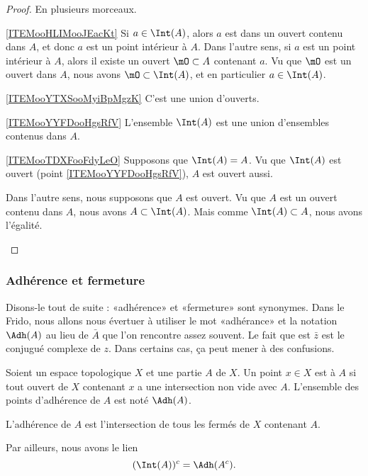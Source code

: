 \begin{proof}
    En plusieurs morceaux.
    \begin{subproof}
    \item[\ref{ITEMooHLIMooJEacKt}]
        Si \( a\in\Int(A)\), alors \( a\) est dans un ouvert contenu dans \( A\), et donc \( a\) est un point intérieur à \( A\). Dans l'autre sens, si \( a\) est un point intérieur à \( A\), alors il existe un ouvert \( \mO\subset A\) contenant \( a\). Vu que \( \mO\) est un ouvert dans \( A\), nous avons \( \mO\subset\Int(A)\), et en particulier \( a\in \Int(A)\).
    \item[\ref{ITEMooYTXSooMyiBpMgzK}]
            C'est une union d'ouverts.
    \item[\ref{ITEMooYYFDooHgsRfV}]
        L'ensemble \( \Int(A)\) est une union d'ensembles contenus dans \( A\).
    \item[\ref{ITEMooTDXFooFdyLeO}]
        Supposons que \( \Int(A)=A\). Vu que \( \Int(A)\) est ouvert (point \ref{ITEMooYYFDooHgsRfV}), \( A\) est ouvert aussi.

        Dans l'autre sens, nous supposons que \( A\) est ouvert. Vu que \( A\) est un ouvert contenu dans \( A\), nous avons \( A\subset\Int(A)\). Mais comme \( \Int(A)\subset A\), nous avons l'égalité.
    \end{subproof}
\end{proof}

\subsubsection{Adhérence et fermeture}

Disons-le tout de suite : «adhérence» et «fermeture» sont synonymes. Dans le Frido, nous allons nous évertuer à utiliser le mot «adhérance» et la notation \( \Adh(A)\) au lieu de \( \bar A\) que l'on rencontre assez souvent. Le fait que est \( \bar z\) est le conjugué complexe de \( z\). Dans certains cas, ça peut mener à des confusions.
\begin{definition}      \label{DEFooSVWMooLpAVZR}
    Soient un espace topologique \( X\) et une partie \( A\) de \( X\). Un point \( x\in X\) est  à \( A\) si tout ouvert de \( X\) contenant \( x\) a une intersection non vide avec \( A\). L'ensemble des points d'adhérence de \( A\) est noté $\Adh(A)$.
\end{definition}

\begin{lemma}       \label{LEMooILNCooOFZaTe}
    L'adhérence de \( A\) est l'intersection de tous les fermés de \( X\) contenant \( A\).

    Par ailleurs, nous avons le lien
    \begin{equation}
      (\Int(A))^c = \Adh(A^c).
    \end{equation}
\end{lemma}

